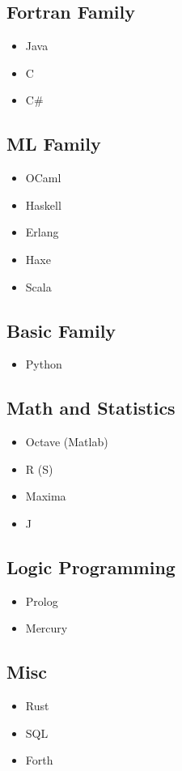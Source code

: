 \documentclass[11pt]{article}
\begin{document}
\subsection{Fortran Family}
\label{sec-4-2}
\begin{itemize}
\item Java
\item C
\item C\#
\end{itemize}
\subsection{ML Family}
\label{sec-4-3}
\begin{itemize}
\item OCaml
\item Haskell
\item Erlang
\item Haxe
\item Scala
\end{itemize}
\subsection{Basic Family}
\label{sec-4-4}
\begin{itemize}
\item Python
\end{itemize}
\subsection{Math and Statistics}
\label{sec-4-5}
\begin{itemize}
\item Octave (Matlab)
\item R (S)
\item Maxima
\item J
\end{itemize}
\subsection{Logic Programming}
\label{sec-4-6}
\begin{itemize}
\item Prolog
\item Mercury
\end{itemize}
\subsection{Misc}
\label{sec-4-7}
\begin{itemize}
\item Rust
\item SQL
\item Forth
\end{itemize}
\end{document}
